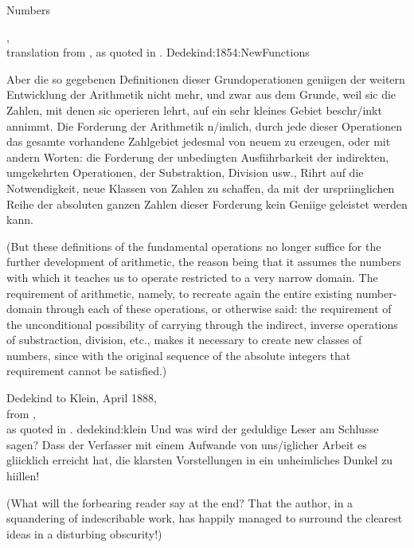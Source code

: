 \begin{plSection}{Numbers}
\label{sec:Numbers}


\begin{plQuote}
{,\\
translation from ,
as quoted in .}
{Dedekind:1854:NewFunctions}
{
{Aber die so gegebenen Definitionen dieser Grundoperationen
geniigen der weitern Entwicklung der Arithmetik nicht mehr, 
und zwar aus dem Grunde, weil sic
die Zahlen, mit denen sic operieren lehrt, auf ein sehr kleines 
Gebiet beschr/inkt annimmt. Die
Forderung der Arithmetik n/imlich, durch jede dieser Operationen 
das gesamte vorhandene Zahlgebiet
jedesmal von neuem zu erzeugen, oder mit andern Worten: 
die Forderung der unbedingten
Ausfiihrbarkeit der indirekten, umgekehrten Operationen, 
der Substraktion, Division usw., Rihrt
auf die Notwendigkeit, neue Klassen von Zahlen zu schaffen, 
da mit der urspriinglichen Reihe
der absoluten ganzen Zahlen 
dieser Forderung kein Geniige geleistet werden kann.}
\par
(But these definitions of the fundamental operations 
no longer suffice for the further development
of arithmetic, the reason being that it assumes the numbers with 
which it teaches us
to operate restricted to a very narrow domain. The requirement of 
arithmetic, namely, to
recreate again the entire existing number-domain through each 
of these operations, or otherwise
said: the requirement of the unconditional possibility 
of carrying through the indirect,
inverse operations of substraction, division, etc., 
makes it necessary to create new classes of
numbers, since with the original sequence 
of the absolute integers that requirement cannot be
satisfied.)}%
\end{plQuote}

\begin{plQuote}
{Dedekind to Klein, April 1888,\\ 
from ,\\
as quoted in .}
{dedekind:klein}
{Und was wird der geduldige Leser am
Schlusse sagen? Dass der Verfasser mit einem Aufwande von uns/iglicher Arbeit es gliicklich
erreicht hat, die klarsten Vorstellungen in ein unheimliches Dunkel zu hiillen!}
\par
(What will the forbearing reader say at the end? That the author, in a squandering of indescribable
work, has happily managed to surround the clearest ideas in a disturbing obscurity!)%
\end{plQuote}


\end{plSection}
